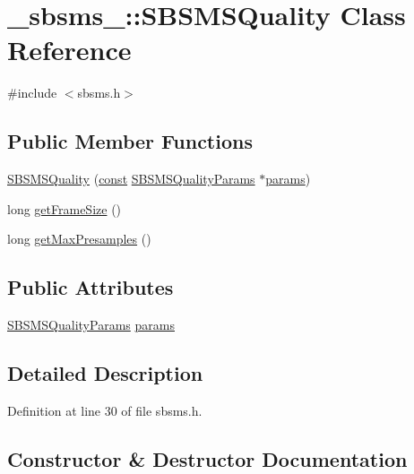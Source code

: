 \hypertarget{class__sbsms___1_1_s_b_s_m_s_quality}{}\section{\+\_\+sbsms\+\_\+\+:\+:S\+B\+S\+M\+S\+Quality Class Reference}
\label{class__sbsms___1_1_s_b_s_m_s_quality}


{\ttfamily \#include $<$sbsms.\+h$>$}

\subsection*{Public Member Functions}
\begin{DoxyCompactItemize}
\item 
\hyperlink{class__sbsms___1_1_s_b_s_m_s_quality_a6cc732e138f2b6a4a709eca3e51db667}{S\+B\+S\+M\+S\+Quality} (\hyperlink{getopt1_8c_a2c212835823e3c54a8ab6d95c652660e}{const} \hyperlink{struct__sbsms___1_1_s_b_s_m_s_quality_params}{S\+B\+S\+M\+S\+Quality\+Params} $\ast$\hyperlink{class__sbsms___1_1_s_b_s_m_s_quality_aaffdf053cc2f970b928f9f39885d9c9e}{params})
\item 
long \hyperlink{class__sbsms___1_1_s_b_s_m_s_quality_acc932b04bcd41698ccd3beeff8465466}{get\+Frame\+Size} ()
\item 
long \hyperlink{class__sbsms___1_1_s_b_s_m_s_quality_ac7cc57ca3f85ef0c75edac9b2f314f1b}{get\+Max\+Presamples} ()
\end{DoxyCompactItemize}
\subsection*{Public Attributes}
\begin{DoxyCompactItemize}
\item 
\hyperlink{struct__sbsms___1_1_s_b_s_m_s_quality_params}{S\+B\+S\+M\+S\+Quality\+Params} \hyperlink{class__sbsms___1_1_s_b_s_m_s_quality_aaffdf053cc2f970b928f9f39885d9c9e}{params}
\end{DoxyCompactItemize}


\subsection{Detailed Description}


Definition at line 30 of file sbsms.\+h.



\subsection{Constructor \& Destructor Documentation}
